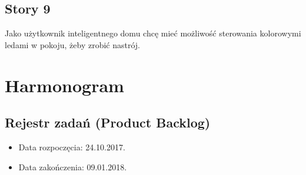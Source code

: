 	\subsection{Story 9}
	Jako użytkownik inteligentnego domu chcę mieć możliwość sterowania kolorowymi ledami w pokoju, żeby zrobić nastrój.
	
	
	\section{Harmonogram}
	
	\subsection{Rejestr zadań (Product Backlog)}
	
	\begin{itemize}
		\item Data rozpoczęcia: 24.10.2017.
		\item  Data zakończenia: 09.01.2018.
	\end{itemize}